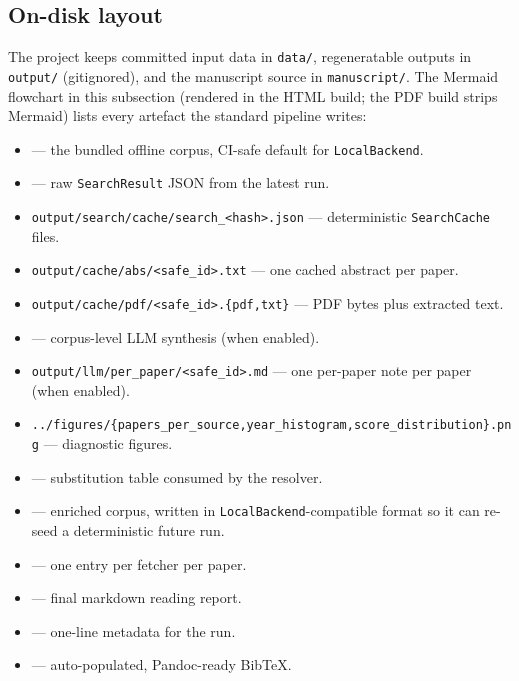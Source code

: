 \documentclass[
]{article}
\providecommand{\tightlist}{%
  \setlength{\itemsep}{0pt}\setlength{\parskip}{0pt}}
\begin{document}
\subsection{On-disk layout}\label{on-disk-layout}

The project keeps committed input data in \texttt{data/}, regeneratable
outputs in \texttt{output/} (gitignored), and the manuscript source in
\texttt{manuscript/}. The Mermaid flowchart in this subsection (rendered
in the HTML build; the PDF build strips Mermaid) lists every artefact
the standard pipeline writes:

\begin{itemize}
\tightlist
\item
   --- the bundled offline corpus, CI-safe
  default for \texttt{LocalBackend}.
\item
   --- raw \texttt{SearchResult} JSON
  from the latest run.
\item
  \texttt{output/search/cache/search\_\textless{}hash\textgreater{}.json}
  --- deterministic \texttt{SearchCache} files.
\item
  \texttt{output/cache/abs/\textless{}safe\_id\textgreater{}.txt} ---
  one cached abstract per paper.
\item
  \texttt{output/cache/pdf/\textless{}safe\_id\textgreater{}.\{pdf,txt\}}
  --- PDF bytes plus extracted text.
\item
   --- corpus-level LLM synthesis (when
  enabled).
\item
  \texttt{output/llm/per\_paper/\textless{}safe\_id\textgreater{}.md}
  --- one per-paper note per paper (when enabled).
\item
  \texttt{../figures/\{papers\_per\_source,year\_histogram,score\_distribution\}.png}
  --- diagnostic figures.
\item
   --- substitution table
  consumed by the resolver.
\item
   --- enriched corpus, written in
  \texttt{LocalBackend}-compatible format so it can re-seed a
  deterministic future run.
\item
   --- one entry per fetcher per
  paper.
\item
   --- final markdown reading report.
\item
   --- one-line metadata for the run.
\item
   --- auto-populated, Pandoc-ready
  BibTeX.
\end{itemize}
\end{document}
